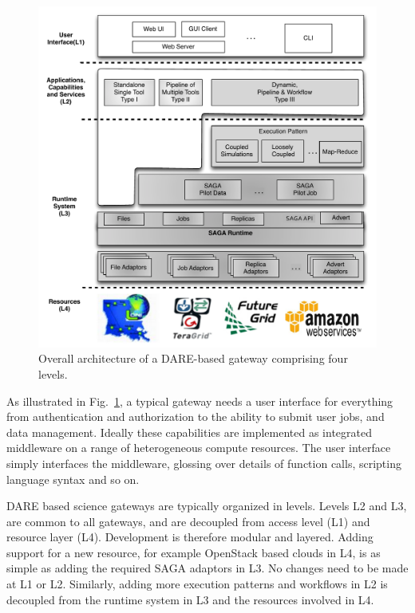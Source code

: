\documentclass[]{svjour3}
\begin{document}
\begin{figure}
 \centering
 \includegraphics[scale=0.55]{figures/DARE-gateway-arch.pdf}
 \caption{\small Overall architecture of a
 DARE-based gateway comprising four levels. 
 }
 \label{fig:dare-arch} 
\end{figure}


As illustrated in Fig.~\ref{fig:dare-arch}, a typical gateway needs a
user interface for everything from authentication and authorization
to the ability to submit user jobs, and data management. 
Ideally these capabilities are implemented as integrated middleware on
a range of heterogeneous compute resources. The user interface simply
interfaces the middleware, glossing over details of function calls,
scripting language syntax and so on.

DARE based science gateways are typically organized in levels.
Levels L2 and L3, are common to all gateways, and are decoupled from
access level (L1) and resource layer (L4). Development is therefore
modular and layered. Adding support for a new resource, for example
OpenStack based clouds in L4, is as simple as adding the required SAGA
adaptors in L3. No changes need to be made at L1 or L2. Similarly,
adding more execution patterns and workflows in L2 is decoupled
from the runtime system in L3 and the resources involved in L4.
\end{document}
